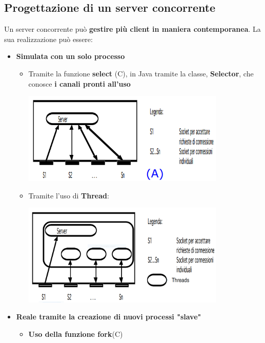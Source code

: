 \documentclass[12pt]{article}
\begin{document}
\subsection{Progettazione di un server concorrente}
Un server concorrente può \textbf{gestire più client in maniera contemporanea}. La sua realizzazione può essere:
\begin{itemize}
    \item \textbf{Simulata con un solo processo}
          \begin{itemize}
              \item Tramite la funzione \textbf{select} (C), in Java tramite la classe, \textbf{Selector}, che conosce \textbf{i canali pronti all'uso}
                    \begin{center}
                        \includegraphics[width = 0.80\textwidth]{Images/36.PNG}
                    \end{center}
                    \newpage
              \item Tramite l'uso di \textbf{Thread}:
                    \begin{center}
                        \includegraphics[width = 0.80\textwidth]{Images/37.PNG}
                    \end{center}
          \end{itemize}
    \item \textbf{Reale tramite la creazione di nuovi processi "slave"}
          \begin{itemize}
              \item \textbf{Uso della funzione fork}(C)

\end{itemize}
\end{itemize}
\end{document}
